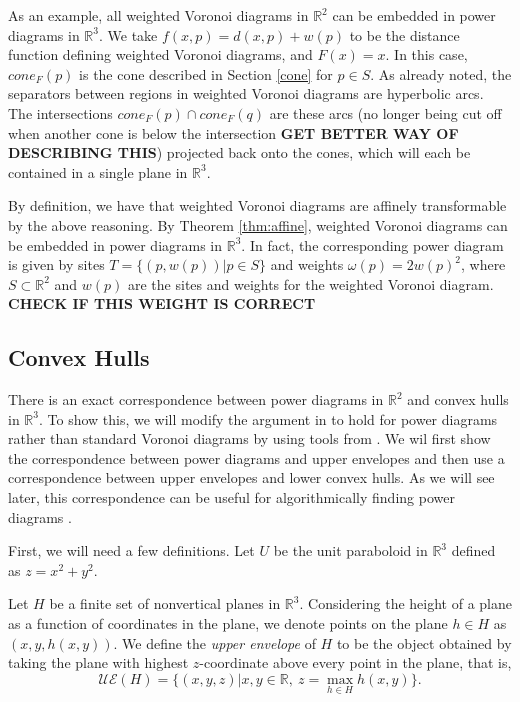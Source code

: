 \documentclass[12pt]{article}
\newcommand{\R}{\mathbb{R}}
\begin{document}
As an example, all weighted Voronoi diagrams in $\R^2$ can be embedded in power diagrams in $\R^3$. We take $f(x,p) = d(x,p) + w(p)$ to be the
distance function defining weighted Voronoi diagrams, and $F(x) = x$. In this case, $cone_F(p)$ is the cone described in Section \ref{cone} for $p \in
S$. As already noted, the separators between regions in weighted Voronoi diagrams are hyperbolic arcs. The intersections $cone_F(p) \cap cone_F(q)$
are these arcs (no longer being cut off when another cone is below the intersection \textbf{GET BETTER WAY OF DESCRIBING THIS}) projected back onto
the cones, which will each be contained in a single plane in $\R^3$.

By definition, we have that weighted Voronoi diagrams are affinely transformable by the above reasoning. By Theorem \ref{thm:affine}, weighted Voronoi
diagrams can be embedded in power diagrams in $\R^3$. In fact, the corresponding power diagram is given by sites $T = \{ (p, w(p)) | p \in S \}$ and
weights $\omega(p) = 2 w(p)^2$, where $S \subset \R^2$ and $w(p)$ are the sites and weights for the weighted Voronoi diagram. \textbf{CHECK IF THIS
WEIGHT IS CORRECT}

\subsection{Convex Hulls}

There is an exact correspondence between power diagrams in $\R^2$ and convex hulls in $\R^3$. To show this, we will modify the argument in
\cite{comp_geom} to hold for power diagrams rather than standard Voronoi diagrams by using tools from \cite{aurenhammer_power}. We wil first show the correspondence between power diagrams and
upper envelopes and then use a correspondence between upper envelopes and lower convex hulls. As we will see later, this correspondence can be useful
for algorithmically finding power diagrams \cite{aurenhammer_power}.

First, we will need a few definitions. Let $U$ be the unit paraboloid in $\R^3$ defined as $z = x^2 + y^2$.

Let $H$ be a finite set of nonvertical planes in $\R^3$. Considering the height of a plane as a function of coordinates in the plane, we denote points
on the plane $h \in H$ as $(x,y,h(x,y))$. We define the \textit{upper envelope} of $H$ to be the object obtained by taking the plane with highest
$z$-coordinate above every point in the plane, that is,
\[ \mathcal{UE}(H) = \{ (x,y,z) | x,y \in \R, \ z = \max_{h \in H} h(x,y) \} .\]
\end{document}
